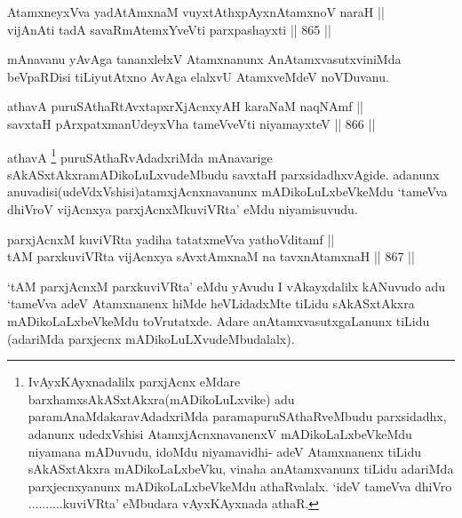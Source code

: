 \begin{shl}
AtamxneyxVva yadA\s \s tAmxnaM vuyxtAthxpAyxnAtamxnoV naraH || \\
vijAnAti tadA savaRmAtemxYveVti parxpashayxti \hfill || 865 ||  
\end{shl}

\begin{artha}
mAnavanu yAvAga tananxlelxV Atamxnanunx AnAtamxvasutxviniMda beVpaRDisi tiLiyutAtxno AvAga elalxvU AtamxveMdeV noVDuvanu.
\end{artha}


\begin{shl}
athavA puruSAthaRtAvxtapxrXjAcnxyAH karaNaM naqNAmf || \\
savxtaH pArxpatxmanUdeyxVha tameVveVti niyamayxteV \hfill || 866 ||  
\end{shl}

\begin{artha}
athavA \footnote{IvAyxKAyxnadalilx parxjAcnx eMdare barxhamxsAkASxtAkxra(mADikoLuLxvike) adu paramAnaMdakaravAdadxriMda paramapuruSAthaRveMbudu parxsidadhx, adanunx udedxVshisi AtamxjAcnxnavanenxV mADikoLaLxbeVkeMdu niyamana mADuvudu, idoMdu niyamavidhi- adeV Atamxnanenx tiLidu sAkASxtAkxra mADikoLaLxbeVku, vinaha anAtamxvanunx tiLidu adariMda parxjecnxyanunx mADikoLaLxbeVkeMdu athaRvalalx. `ideV tameVva dhiVro ..........kuviVRta' eMbudara vAyxKAyxnada athaR.} puruSAthaRvAdadxriMda mAnavarige sAkASxtAkxramADikoLuLxvudeMbudu savxtaH parxsidadhxvAgide. adanunx anuvadisi(udeVdxVshisi)atamxjAcnxnavanunx mADikoLuLxbeVkeMdu `tameVva dhiVroV vijAcnxya parxjAcnxMkuviVRta' eMdu niyamisuvudu.
\end{artha}


\begin{shl}
parxjAcnxM kuviVRta yadiha tatatxmeVva yathoVditamf || \\
tAM parxkuviVRta vijAcnxya sAvxtAmxnaM na tavxnAtamxnaH \hfill || 867 ||  
\end{shl}

\begin{artha}
`tAM parxjAcnxM parxkuviVRta' eMdu yAvudu I vAkayxdalilx kANuvudo adu `tameVva adeV Atamxnanenx hiMde heVLidadxMte tiLidu sAkASxtAkxra mADikoLaLxbeVkeMdu toVrutatxde. Adare anAtamxvasutxgaLanunx tiLidu (adariMda parxjecnx mADikoLuLXvudeMbudalalx).
\end{artha}

